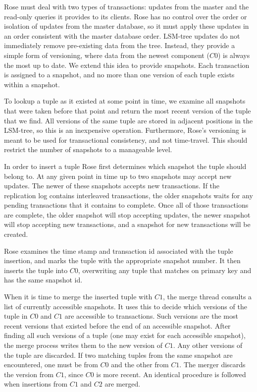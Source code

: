\documentclass{vldb}
\newcommand{\rows}{Rose\xspace}
\newcommand{\rowss}{Rose's\xspace}
\begin{document}
\rows must deal with two types of transactions: updates from the
master and the read-only queries it provides to its clients.  \rows
has no control over the order or isolation of updates from the master
database, so it must apply these updates in an order consistent with
the master database order.  LSM-tree updates do not immediately remove
pre-existing data from the tree.  Instead, they provide a simple form
of versioning, where data from the newest component ($C0$) is always
the most up to date.  We extend this idea to provide snapshots.  Each
transaction is assigned to a snapshot, and no more than one version of
each tuple exists within a snapshot.

To lookup a tuple as it existed at some point in time, we examine all
snapshots that were taken before that point and return the most recent
version of the tuple that we find.  All versions of the same tuple are
stored in adjacent positions in the LSM-tree, so this is an
inexpensive operation.  Furthermore, \rowss versioning is meant to be
used for transactional consistency, and not time-travel.  This should
restrict the number of snapshots to a manageable level.

In order to insert a tuple \rows first determines which snapshot the
tuple should belong to.  At any given point in time up to two snapshots
may accept new updates.  The newer of these snapshots accepts new
transactions.  If the replication log contains interleaved transactions,
the older snapshots waits for any pending transactions that
it contains to complete.  Once all of those transactions are complete,
the older snapshot will stop accepting updates, the newer snapshot
will stop accepting new transactions, and a snapshot for new
transactions will be created.

\rows examines the time stamp and transaction id associated with the tuple insertion,
and marks the tuple with the appropriate snapshot number.  It then
inserts the tuple into $C0$, overwriting any tuple that matches on
primary key and has the same snapshot id.

When it is time to merge the inserted tuple with $C1$, the merge
thread consults a list of currently accessible snapshots.  It uses this
to decide which versions of the tuple in $C0$ and $C1$ are accessible
to transactions.  Such versions are the most recent versions that
existed before the end of an accessible snapshot.  After finding all
such versions of a tuple (one may exist for each accessible snapshot),
the merge process writes them to the new version of $C1$.  Any other
versions of the tuple are discarded.  If two matching tuples from the
same snapshot are encountered, one must be from $C0$ and the other
from $C1$.  The merger discards the version from $C1$, since $C0$ is
more recent.  An identical procedure is followed when insertions from
$C1$ and $C2$ are merged.
\end{document}
